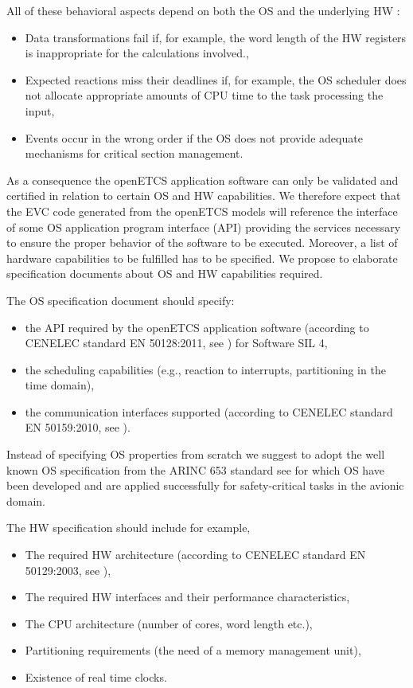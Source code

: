 \documentclass{template/openetcs_report}
\begin{document}
All of these behavioral aspects depend on both the OS and the underlying HW \cite{BraPeFe12}:
\begin{itemize}\itemsep=0pt
  \item Data transformations fail if, for example, the word length of the HW registers is inappropriate for the calculations involved.,
  \item Expected reactions miss their deadlines if, for example, the OS scheduler does not allocate appropriate amounts of CPU time to the task processing the input,
  \item Events occur in the wrong order if the OS does not provide adequate mechanisms for critical section management.
\end{itemize}

As a consequence the openETCS application software can only be validated and certified in relation to certain OS and HW capabilities.
We therefore expect that the EVC code generated from the openETCS models will reference the interface of some OS application program interface (API) providing the services necessary to ensure the proper behavior of the software to be executed. Moreover, a list of hardware capabilities to be fulfilled has to be specified. 
We propose to elaborate specification documents about OS and HW capabilities required. 

The OS specification document should specify:
\begin{itemize}\itemsep=0pt
  \item the API required by the openETCS application software (according to CENELEC standard EN 50128:2011, see \cite{EN50159}) for Software SIL 4,
  \item the scheduling capabilities (e.g., reaction to interrupts, partitioning in the time domain),
  \item the communication interfaces supported (according to CENELEC standard EN 50159:2010, see \cite{EN50159}).
\end{itemize}

Instead of specifying OS properties from scratch we suggest to adopt the well known OS specification from the ARINC 653 standard see \cite{ARINC} for which OS have been developed and are applied successfully for safety-critical tasks in the avionic domain.

The HW specification should include for example,
\begin{itemize}\itemsep=0pt
  \item The required HW architecture (according to CENELEC standard EN 50129:2003, see \cite{EN50129}),
  \item The required HW interfaces and their performance characteristics,
  \item The CPU architecture (number of cores, word length etc.),
  \item Partitioning requirements (the need of a memory management unit),
  \item Existence of real time clocks.
\end{itemize}
\end{document}
